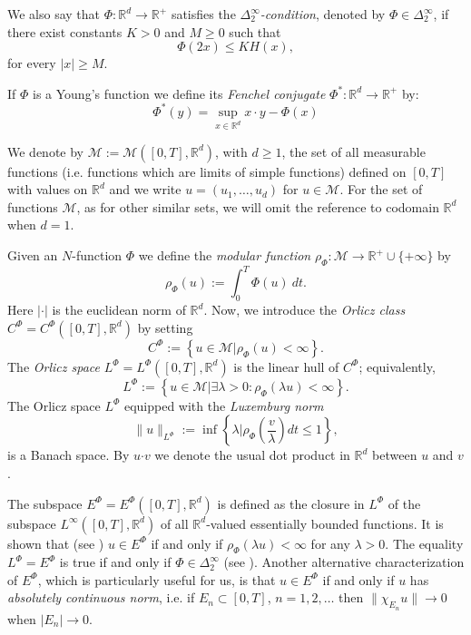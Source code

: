 \documentclass[twoside]{article}
\theoremstyle{remark}
\newcommand{\orlnor}{\|_{L^{\Phi}}}
\newcommand{\lphi}{L^{\Phi}}
\newcommand{\ephi}{E^{\Phi}}
\newcommand{\claseor}{C^{\Phi}}
\renewcommand{\b}[1]{\boldsymbol{#1}}
\newcommand{\rr}{\mathbb{R}}
\renewcommand{\leq}{\leqslant}
\renewcommand{\geq}{\geqslant}
\begin{document}
We also say that $\Phi:\mathbb{R}^d\rightarrow \mathbb{R}^+$ satisfies the  \emph{$\Delta_2^{\infty}$-condition}, denoted by $\Phi \in \Delta_2^{\infty}$,
if there exist  constants $K>0$ and  $M\geq 0$ such that
\begin{equation}\label{delta2defi}\Phi(2x)\leq KH(x),
\end{equation}
for every $|x|\geq M$.

If $\Phi$ is a Young's function we define its \emph{Fenchel conjugate}   $\Phi^*:\mathbb{R}^d\to \mathbb{R}^+ $ by:
\begin{equation}\label{eq:conjugada}
 \Phi^*(y)=\sup\limits_{x\in\mathbb{R}^d} x\cdot y-\Phi(x)
\end{equation}


 We denote by $\mathcal{M}:=\mathcal{M}([0,T],\rr^d)$, with $d\geq 1$,  the set of all measurable functions (i.e. functions which are limits of simple functions)  defined on $[0,T]$ with values on $\mathbb{R}^d$ and  we write $u=(u_1,\dots,u_d)$ for  $u\in \mathcal{M}$. For the set of functions $\mathcal{M}$, as for other similar sets, we will omit the reference to codomain $\mathbb{R}^d$ when $d=1$.


Given  an $N$-function $\Phi$ we define the \emph{modular function} 
$\rho_{\Phi}:\mathcal{M}\to \mathbb{R}^+\cup\{+\infty\}$ by
\[\rho_{\Phi}(u):= \int_0^T \Phi(u)\ dt.\]
Here $|\cdot|$ is the euclidean norm of $\mathbb{R}^d$.
Now, we introduce the \emph{Orlicz class} $C^{\Phi}=C^{\Phi}([0,T],\rr^d)$   by setting
\begin{equation}\label{claseOrlicz}
  C^{\Phi}:=\left\{u\in \mathcal{M} | \rho_{\Phi}(u)< \infty \right\}.
\end{equation}
The \emph{Orlicz space} $\lphi=L^{\Phi}([0,T],\rr^d)$ is the linear hull of $\claseor$;
equivalently,
\begin{equation}\label{espacioOrlicz}
\lphi:=\left\{ u\in \mathcal{M}| \exists \lambda>0: \rho_{\Phi}(\lambda u) < \infty   \right\}.
\end{equation}
  The Orlicz space $\lphi$ equipped with the \emph{Luxemburg norm}
\[
\|  u  \orlnor:=\inf \left\{ \lambda\bigg| \rho_{\Phi}\left(\frac{v}{\lambda}\right) dt\leq 1\right\},
\]
is a Banach space. By $u\b{\cdot} v$ we denote the usual dot product in $\mathbb{R}^{d}$ between $u$ and $v$.


The subspace $\ephi=\ephi([0,T],\rr^d)$ is defined as the closure in $\lphi$ of the subspace $L^{\infty}([0,T],\rr^d)$ of all $\mathbb{R}^d$-valued essentially bounded functions. It is shown that  (see \cite[Thm. 5.1]{Orliczvectorial2005}) $u\in\ephi$  if and only if $\rho_{\Phi}(\lambda u)<\infty$ for any $\lambda>0$. The equality $\lphi=\ephi$ is true if and only if $\Phi\in\Delta_2^{\infty}$ (see \cite[Thm. 5.2]{Orliczvectorial2005}). Another alternative characterization of $\ephi$, which is particularly useful for us, is that $u\in\ephi$ if and only if $u$ has  \emph{absolutely continuous norm}, i.e.   if $E_n\subset [0,T]$, $n=1,2,\ldots$ then $\|\chi_{E_n}u\|\to 0$ when $|E_n|\to 0$.
\end{document}
